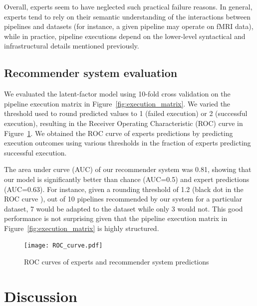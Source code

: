 \documentclass[conference]{IEEEtran}
\begin{document}
Overall, experts seem to have neglected such practical failure reasons. In
general, experts tend to rely on their semantic understanding of the
interactions between pipelines and datasets (for instance, a given pipeline
may operate on fMRI data), while in practice, pipeline executions depend on
the lower-level syntactical and infrastructural details mentioned previously.




\subsection{Recommender system evaluation} 

We evaluated the latent-factor model using 10-fold cross validation on the
pipeline execution matrix in Figure~\ref{fig:execution_matrix}. We varied
the threshold used to round predicted values to 1 (failed execution) or 2
(successful execution), resulting in the Receiver Operating Characteristic
(ROC) curve  in Figure~\ref{fig:roc-curve}. We obtained the ROC curve of
experts predictions by predicting execution outcomes using various
thresholds in the fraction of experts predicting successful execution. 

The area under curve (AUC) of our recommender system was 0.81, showing that
our model is significantly better than chance (AUC=0.5) and expert
predictions (AUC=0.63). For instance, given a rounding threshold of 1.2
(black dot in the ROC curve ), out of 10 pipelines
recommended by our system for a particular dataset, 7 would be adapted to
the dataset while only 3 would not. This good performance is not surprising
given that the pipeline execution matrix in
Figure~\ref{fig:execution_matrix} is highly structured.

\begin{figure}
\centering
  \texttt{[image: ROC\_curve.pdf]}
  \caption{ROC curves of experts and recommender system predictions}
  \label{fig:roc-curve}
\end{figure}

\section{Discussion}
\end{document}
